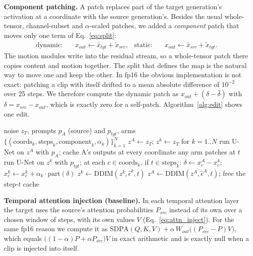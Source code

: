 \documentclass[twoside,english]{article}
\newcommand{\xs}{\bar{x}}         %
\newcommand{\xd}{\tilde{x}}       %
\begin{document}
\textbf{Component patching.} A patch replaces part of the target generation's activation at a
coordinate with the source generation's. Besides the usual whole-tensor, channel-subset and
$\alpha$-scaled patches, we added a \emph{component} patch that moves only one term of
Eq.~\eqref{eq:split}:
\begin{align}
\text{dynamic:}\quad & x_{out} \leftarrow \xs_{tgt} + \xd_{src}, &
\text{static:}\quad & x_{out} \leftarrow \xs_{src} + \xd_{tgt}.
\end{align}
The motion modules write into the residual stream, so a whole-tensor patch there copies content and
motion together. The split that defines the map is the natural way to move one and keep the other.
In fp16 the obvious implementation is not exact: patching a clip with itself drifted to a mean absolute
difference of $10^{-2}$ over 25 steps. We therefore compute the dynamic patch as
$x_{out} + (\delta - \bar\delta)$ with $\delta = x_{src} - x_{out}$, which is exactly zero for a self-patch.
Algorithm~\ref{alg:edit} shows one edit.

\begin{algorithm}[!h]
\caption{One edit: source A and $N$ target arms denoised in lockstep from one noise tensor}
\label{alg:edit}
\begin{algorithmic}[1]
\Require noise $z_T$, prompts $p_A$ (source) and $p_{tgt}$, arms $\{(\text{coords}_k, \text{steps}_k, \text{component}_k, \alpha_k)\}_{k=1}^N$
\State $z^{A} \gets z_T$; \; $z^{k} \gets z_T$ for $k = 1..N$
  \State run U-Net on $z^{A}$ with $p_A$; cache A's outputs at every coordinate any arm patches at $t$
    \State run U-Net on $z^{k}$ with $p_{tgt}$; at each $c \in \text{coords}_k$, if $t \in \text{steps}_k$:
    \State \hspace{1em} $\delta \gets x^A_c - x^k_c$; \; $x^k_c \gets x^k_c + \alpha_k \cdot \mathrm{part}(\delta)$
    \State $z^{k} \gets \mathrm{DDIM}(z^{k}, \hat\epsilon^{k}, t)$
  \EndFor
  \State $z^{A} \gets \mathrm{DDIM}(z^{A}, \hat\epsilon^{A}, t)$; free the step-$t$ cache
\EndFor
\end{algorithmic}
\end{algorithm}

\textbf{Temporal attention injection (baseline).} In each temporal attention layer the target uses the
source's attention probabilities $P_{src}$ instead of its own over a chosen window of steps, with its own
values $V$ (Eq.~\eqref{eq:attn_inject}). For the same fp16 reason we compute it as
$\mathrm{SDPA}(Q,K,V) + \alpha\, W_{out}\big((P_{src}-P)V\big)$, which equals
$\big((1-\alpha)P + \alpha P_{src}\big)V$ in exact arithmetic and is exactly null when a clip is injected
into itself.
\end{document}
